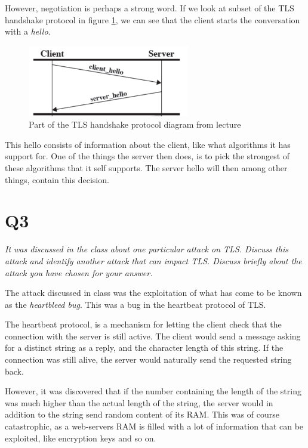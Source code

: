 \documentclass{article}
\begin{document}
However, negotiation is perhaps a strong word. If we look at subset of the TLS handshake protocol in figure \ref{TLS}, we can see that the client starts the conversation with a \textit{hello}.


\begin{figure}[H]
 \centering
  \includegraphics[width=200pt]{img/tlsHandshake.png}
 \caption{Part of the TLS handshake protocol diagram from lecture}
  \label{TLS}
 \end{figure}


This hello consists of information about the client, like what algorithms it has support for. One of the things the server then does, is to pick the strongest of these algorithms that it self supports. The server hello will then among other things, contain this decision.



\newpage
\section{Q3}
\begin{tcolorbox}
  \textit{It was discussed in the class about one particular attack on TLS. Discuss this attack and identify another attack that can impact TLS. Discuss briefly about the attack you have chosen for your answer.}
\end{tcolorbox}
The attack discussed in class was the exploitation of what has come to be known as the \textit{heartbleed bug}. This was a bug in the heartbeat protocol of TLS.

The heartbeat protocol, is a mechanism for letting the client check that the connection with the server is still active. The client would send a message asking for a distinct string as a reply, and the character length of this string. If the connection was still alive, the server would naturally send the requested string back.

However, it was discovered that if the number containing the length of the string was much higher than the actual length of the string, the server would in addition to the string send random content of its RAM. This was of course catastrophic, as a web-servers RAM is filled with a lot of information that can be exploited, like encryption keys and so on.
\end{document}
